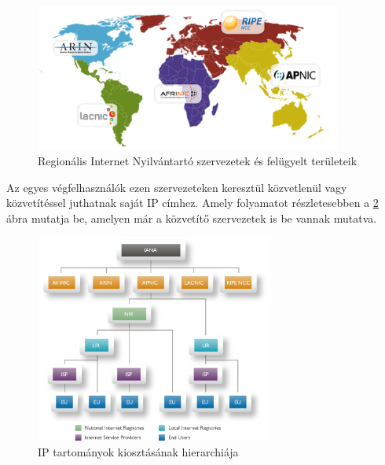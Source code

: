 \begin{figure}[!ht]
	\centering
	\includegraphics[width=0.9\textwidth, keepaspectratio]{figures/rir-regions.png}
	\caption{Regionális Internet Nyilvántartó szervezetek és felügyelt területeik \protect\footnotemark}
	\label{fig:rir-regions}
\end{figure}


\newpage

Az egyes végfelhasználók ezen szervezeteken keresztül közvetlenül vagy közvetítéssel juthatnak saját IP címhez. Amely folyamatot részletesebben a \ref{fig:ipv4_hierarchy} ábra mutatja be, amelyen már a közvetítő szervezetek is be vannak mutatva.

\begin{figure}[!ht]
	\centering
	\includegraphics[width=0.7\textwidth, keepaspectratio]{figures/ipv4_hierarchy.png}
	\caption{IP tartományok kiosztásának hierarchiája\protect\footnotemark}
	\label{fig:ipv4_hierarchy}
\end{figure}



